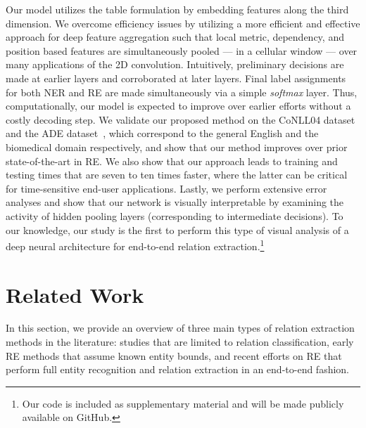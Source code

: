 \documentclass{clv3}
\newcommand{\ere}{RE}
\begin{document}
Our model utilizes the table formulation by embedding features along the third dimension. We overcome efficiency issues by utilizing a more efficient and effective approach for deep feature aggregation such that local metric, dependency, and position based features are simultaneously pooled --- in a  cellular window --- over many applications of the 2D convolution. Intuitively, preliminary decisions are made at earlier layers and corroborated at later layers. Final label assignments for both NER and RE are made simultaneously via a simple \emph{softmax} layer. Thus, computationally, our model is expected to improve over earlier efforts without a costly decoding step. We validate our proposed method on the CoNLL04 dataset~\cite{roth2004linear} and the ADE dataset~\cite{gurulingappa2012development}, which correspond to the general English and the biomedical domain respectively, and show that our method improves over   prior state-of-the-art in \ere{}. We also show that our approach leads to training and testing times that are seven to ten times faster, where the latter can be critical for time-sensitive end-user applications. Lastly, we perform extensive error analyses and show that our network is visually interpretable by examining the activity of hidden pooling layers (corresponding to intermediate decisions). To our knowledge, our study is the first to perform this type of visual analysis of a deep neural architecture for end-to-end relation extraction.\footnote{Our code is included as supplementary material and will be made publicly available on GitHub.}


\section{Related Work}

In this section, we provide an overview of three main types of relation extraction methods in the literature: studies that are limited to relation classification, early \ere{} methods that assume known entity bounds, and recent efforts on \ere{} that perform full entity recognition and relation extraction in an end-to-end fashion. 
\end{document}
